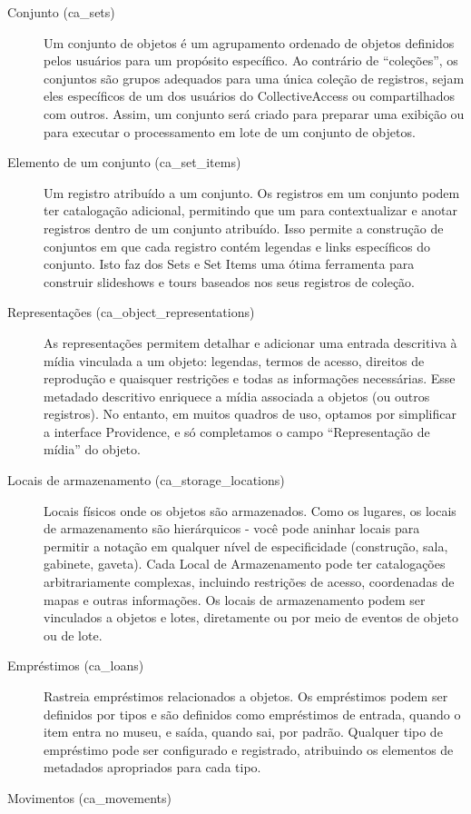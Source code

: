 \begin{description}
	\item[Conjunto (ca\_sets)] Um conjunto de objetos é um agrupamento ordenado de objetos definidos pelos usuários para um propósito específico.	Ao contrário de ``coleções'', os conjuntos são grupos adequados para uma única coleção de registros, sejam eles específicos de um dos usuários do CollectiveAccess ou compartilhados com outros.	Assim, um conjunto será criado para preparar uma exibição ou para executar o processamento em lote de um conjunto de objetos.
	\item[Elemento de um conjunto (ca\_set\_items)] Um registro atribuído a um conjunto. Os registros em um conjunto podem ter catalogação adicional, permitindo que um para contextualizar e anotar registros dentro de um conjunto atribuído. Isso permite a construção de conjuntos em que cada registro contém legendas e links específicos do conjunto. Isto faz dos Sets e Set Items uma ótima ferramenta para construir slideshows e tours baseados nos seus registros de coleção.
	\item[Representações (ca\_object\_representations)] As representações permitem detalhar e adicionar uma entrada descritiva à mídia vinculada a um objeto: legendas, termos de acesso, direitos de reprodução e quaisquer restrições e todas as informações necessárias. Esse metadado descritivo enriquece a mídia associada a objetos (ou outros registros).	No entanto, em muitos quadros de uso, optamos por simplificar a interface Providence, e só completamos o campo ``Representação de mídia'' do objeto.
	\item[Locais de armazenamento (ca\_storage\_locations)] Locais físicos onde os objetos são armazenados. Como os lugares, os locais de armazenamento são hierárquicos - você pode aninhar locais para permitir a notação em qualquer nível de especificidade (construção, sala, gabinete, gaveta). Cada Local de Armazenamento pode ter catalogações arbitrariamente complexas, incluindo restrições de acesso, coordenadas de mapas e outras informações. Os locais de armazenamento podem ser vinculados a objetos e lotes, diretamente ou por meio de eventos de objeto ou de lote.
	\item[Empréstimos (ca\_loans)] Rastreia empréstimos relacionados a objetos. Os empréstimos podem ser definidos por tipos e são definidos como empréstimos de entrada, quando o item entra no museu, e saída, quando sai, por padrão. Qualquer tipo de empréstimo pode ser configurado e registrado, atribuindo os elementos de metadados apropriados para cada tipo.
	\item[Movimentos (ca\_movements)] 

\end{description}
